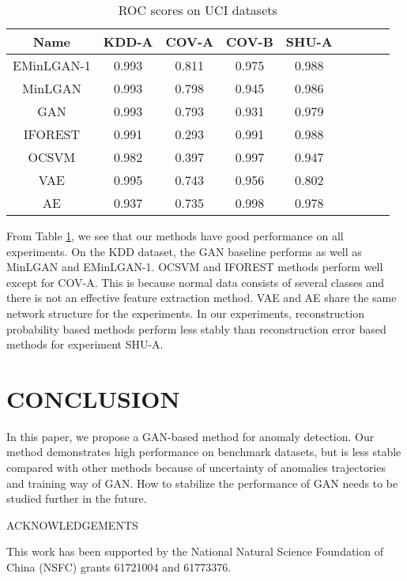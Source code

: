 \documentclass[a4paper,conference]{IEEEtran}
\begin{document}
\begin{table}[t]
\caption{ROC scores on UCI datasets \label{UCIresult}}
\setlength{\abovecaptionskip}{-10pt}
\center
\footnotesize
\begin{tabular}{ccccccccc}
\hline
{Name}& {KDD-A}& {COV-A} & {COV-B} & {SHU-A}\\
\hline
EMinLGAN-1&0.993  &0.811& 0.975&0.988 \\
\hline
MinLGAN&0.993  &0.798& 0.945&0.986 \\
\hline
GAN    &0.993 &0.793& 0.931&0.979  \\
\hline
IFOREST&0.991 &0.293& 0.991&0.988  \\
\hline
OCSVM  &0.982 &0.397& 0.997&0.947  \\
\hline
VAE    &0.995 &0.743& 0.956&0.802\\
\hline
AE     &0.937 &0.735& 0.998&0.978\\
\hline
\end{tabular}
\end{table}





From Table \ref{UCIresult},  we see that  our methods  have good performance on all experiments. On the KDD dataset, the GAN baseline performs as well as MinLGAN and EMinLGAN-1. OCSVM and IFOREST methods perform well except for COV-A. This is because normal data consists of several classes and there is not an effective feature extraction method. VAE and AE share the same network structure for the experiments. In our experiments, reconstruction probability based methods perform less stably than reconstruction error based methods for experiment SHU-A.
\section{CONCLUSION}

In this paper, we propose a  GAN-based  method  for anomaly detection. Our method demonstrates high performance on benchmark datasets, but is less stable compared with other methods because of uncertainty of anomalies trajectories and  training way of GAN. How to stabilize the performance of GAN  needs to be studied further in the future.

\vspace{0.5cm}
\begin{center}
ACKNOWLEDGEMENTS
\end{center}

This work has been supported by the National Natural Science Foundation of China (NSFC) grants 61721004 and 61773376.
\end{document}
